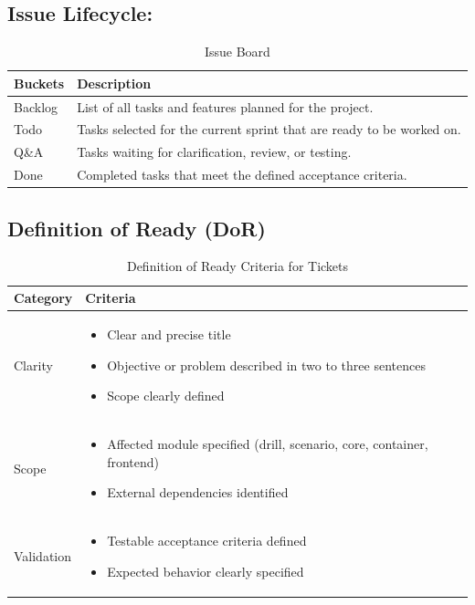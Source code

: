 \subsection{Issue Lifecycle:}\label{subsec:lifecycle}
\begin{table}[H]
	\centering
	\begin{tabular}{ll}
		\toprule
		\textbf{Buckets} & \textbf{Description} \\
		\midrule
		Backlog & List of all tasks and features planned for the project. \\
		Todo & Tasks selected for the current sprint that are ready to be worked on. \\
		Q\&A & Tasks waiting for clarification, review, or testing. \\
		Done & Completed tasks that meet the defined acceptance criteria. \\
		\bottomrule
	\end{tabular}
	\caption{Issue Board}
	\label{tab:issue-board}
\end{table}

\subsection{Definition of Ready (DoR)}\label{subsec:definition-of-ready}
\begin{table}[H]
	\centering
	\begin{tabularx}{\textwidth}{lX}
		\toprule
		\textbf{Category} & \textbf{Criteria} \\
		\midrule
		Clarity &
		\begin{itemize}
			\item Clear and precise title
			\item Objective or problem described in two to three sentences
			\item Scope clearly defined
		\end{itemize} \\

		Scope &
		\begin{itemize}
			\item Affected module specified (drill, scenario, core, container, frontend)
			\item External dependencies identified
		\end{itemize} \\

		Validation &
		\begin{itemize}
			\item Testable acceptance criteria defined
			\item Expected behavior clearly specified
		\end{itemize} \\
		\bottomrule
	\end{tabularx}
	\caption{Definition of Ready Criteria for Tickets}
	\label{tab:definition-of-ready}
\end{table}

